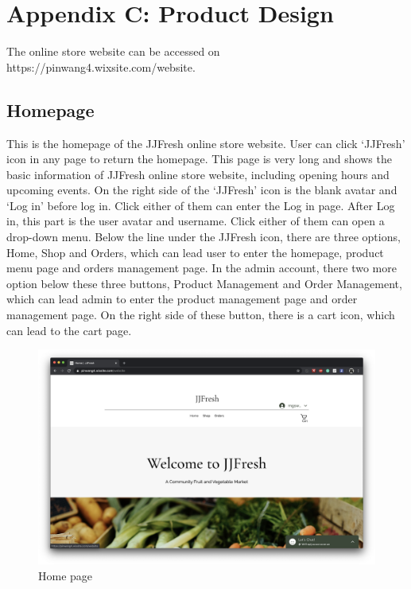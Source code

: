 \chapter*{Appendix C: Product Design}
The online store website can be accessed on https://pinwang4.wixsite.com/website.

\section*{Homepage}
This is the homepage of the JJFresh online store website. User can click ‘JJFresh’ icon in any page to return the homepage.
This page is very long and shows the basic information of JJFresh online store website, including opening hours and upcoming events.
On the right side of the ‘JJFresh’ icon is the blank avatar and ‘Log in’ before log in. Click either of them can enter the Log in page. After Log in, this part is the user avatar and username. Click either of them can open a drop-down menu.
Below the line under the JJFresh icon, there are three options, Home, Shop and Orders, which can lead user to enter the homepage, product menu page and orders management page. In the admin account, there two more option below these three buttons, Product Management and Order Management, which can lead admin to enter the product management page and order management page. On the right side of these button, there is a cart icon, which can lead to the cart page.
\begin{figure}[htp]
\centering
\includegraphics[width=\textwidth]{Figures/homepage.png}
\caption{Home page}
\label{fig:homepage}
\end{figure}

\clearpage
